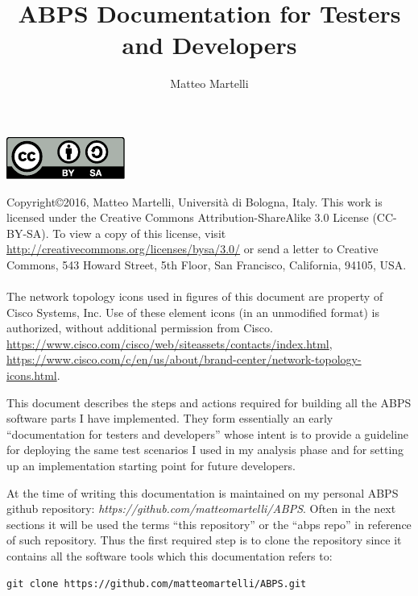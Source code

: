 \documentclass[a4paper]{article}
\title{ABPS Documentation for Testers and Developers}
\author{Matteo Martelli}
\begin{document}
\maketitle
{
	\begin{spacing}{0.2}
		\tiny
		\vspace*{\fill}
		\begin{center}
			 {
				\includegraphics{ccbysa.pdf}
			}{}
		\end{center}
		Copyright\copyright  2016, Matteo Martelli, Università di Bologna, Italy.
		This work is licensed under the Creative Commons Attribution-ShareAlike 3.0 License
		(CC-BY-SA). To view a copy of this license, visit
		\url{http://creativecommons.org/licenses/bysa/3.0/}
		or send a letter to Creative Commons, 543 Howard Street, 5th Floor, San
		Francisco, California, 94105, USA.
		\\\\
		The network topology icons used in figures of this document are property of Cisco
		Systems, Inc. Use of these element icons (in an unmodified format) is authorized, without additional permission from Cisco.
        \url{https://www.cisco.com/cisco/web/siteassets/contacts/index.html},
		\url{https://www.cisco.com/c/en/us/about/brand-center/network-topology-icons.html}.
	\end{spacing}
}

\newpage

This document describes the steps and actions required for
building all the ABPS software parts I have implemented. They
form essentially an early ``documentation for testers and developers''
whose intent is to provide a
guideline for deploying the same test scenarios I used in my analysis
phase and for setting up an implementation starting point for future
developers.

At the time of writing this documentation is maintained on my personal ABPS github
repository: \emph{https://github.com/matteomartelli/ABPS}. Often in the
next sections it will be used the terms ``this repository'' or the ``abps
repo'' in reference of such repository. Thus the first required step is to
clone the repository since it contains all the software tools which this
documentation refers to:

\begin{lstlisting}
git clone https://github.com/matteomartelli/ABPS.git
\end{lstlisting}
\end{document}
